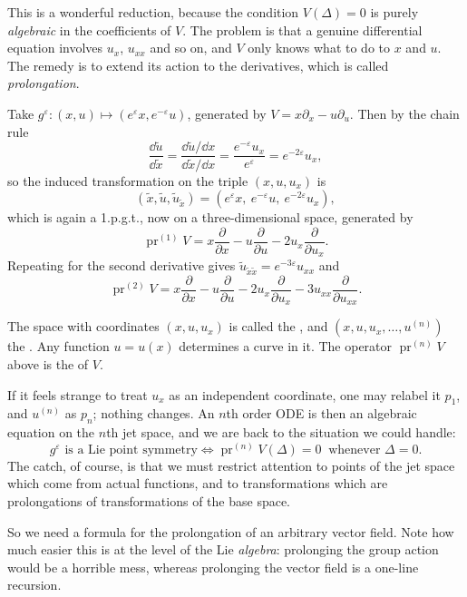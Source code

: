 \documentclass[a4paper]{scrartcl}
\newcommand{\pr}{\operatorname{pr}}
\begin{document}
This is a wonderful reduction, because the condition $V(\Delta) = 0$ is purely \emph{algebraic} in the coefficients of $V$. The problem is that a genuine differential equation involves $u_x$, $u_{xx}$ and so on, and $V$ only knows what to do to $x$ and $u$. The remedy is to extend its action to the derivatives, which is called \emph{prolongation}.

\begin{example}
	Take $g^\varepsilon : (x,u)\mapsto(e^\varepsilon x, e^{-\varepsilon}u)$, generated by $V = x\partial_x - u\partial_u$. Then by the chain rule
	$$
	\frac{\dd\tilde u}{\dd\tilde x} = \frac{\dd\tilde u/\dd x}{\dd\tilde x/\dd x} = \frac{e^{-\varepsilon}u_x}{e^\varepsilon} = e^{-2\varepsilon}u_x,
	$$
	so the induced transformation on the triple $(x,u,u_x)$ is
	$$
	\left(\tilde x,\tilde u,\tilde u_{\tilde x}\right) = \left(e^\varepsilon x,\ e^{-\varepsilon}u,\ e^{-2\varepsilon}u_x\right),
	$$
	which is again a 1.p.g.t., now on a three-dimensional space, generated by
	$$
	\pr^{(1)}V = x\frac{\partial}{\partial x} - u\frac{\partial}{\partial u} - 2u_x\frac{\partial}{\partial u_x}.
	$$
	Repeating for the second derivative gives $\tilde u_{\tilde x\tilde x} = e^{-3\varepsilon}u_{xx}$ and
	$$
	\pr^{(2)}V = x\frac{\partial}{\partial x} - u\frac{\partial}{\partial u} - 2u_x\frac{\partial}{\partial u_x} - 3u_{xx}\frac{\partial}{\partial u_{xx}}.
	$$
\end{example}

The space with coordinates $(x,u,u_x)$ is called the , and $(x,u,u_x,\dots,u^{(n)})$ the . Any function $u = u(x)$ determines a curve in it. The operator $\pr^{(n)}V$ above is the  of $V$.

If it feels strange to treat $u_x$ as an independent coordinate, one may relabel it $p_1$, and $u^{(n)}$ as $p_n$; nothing changes. An $n$th order ODE is then an algebraic equation on the $n$th jet space, and we are back to the situation we could handle:
$$
g^\varepsilon\text{ is a Lie point symmetry} \iff \pr^{(n)}V(\Delta) = 0\ \text{ whenever }\Delta = 0.
$$
The catch, of course, is that we must restrict attention to points of the jet space which come from actual functions, and to transformations which are prolongations of transformations of the base space.

So we need a formula for the prolongation of an arbitrary vector field. Note how much easier this is at the level of the Lie \emph{algebra}: prolonging the group action would be a horrible mess, whereas prolonging the vector field is a one-line recursion.
\end{document}
